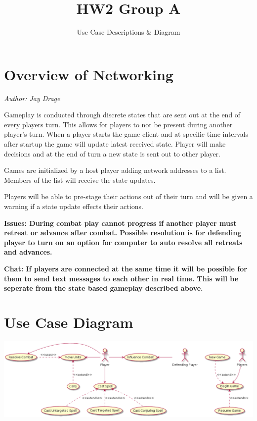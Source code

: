 ﻿\documentclass{article}
\title{HW2 Group A}
\subtitle{Use Case Descriptions \& Diagram}
\begin{document}
\section*{Overview of Networking}
\it{Author: Jay Drage}

Gameplay is conducted through discrete states that are sent out at the end of every players turn. This allows for players to not be present during another player's turn. When a player starts the game client and at specific time intervals after startup the game will update latest received state. Player will make decisions and at the end of turn a new state is sent out to other player. 

Games are initialized by a host player adding network addresses to a list. Members of the list will receive the state updates.

Players will be able to pre-stage their actions out of their turn and will be given a warning if a state update effects their actions.

\bf{Issues:} 
During combat play cannot progress if another player must retreat or advance after combat. Possible resolution is for defending player to turn on an option for computer to auto resolve all retreats and advances.

\bf{Chat:}
If players are connected at the same time it will be possible for them to send text messages to each other in real time. This will be seperate from the state based gameplay described above.



\section*{Use Case Diagram}
\includegraphics[width=\textwidth]{use_cases.png}

\tableofcontents
\end{document}

